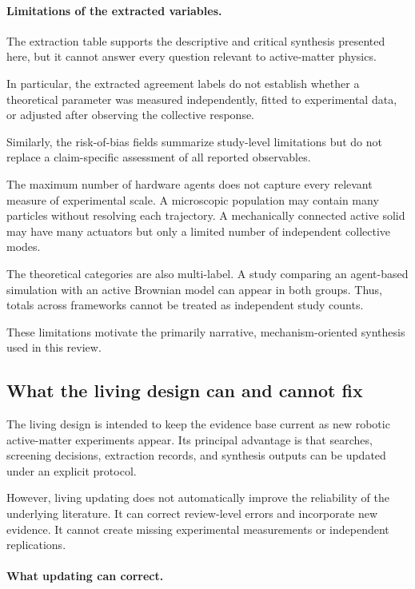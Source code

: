 \paragraph*{Limitations of the extracted variables.}

The extraction table supports
the descriptive and
critical synthesis
presented here,
but it cannot
answer every
question relevant
to active-matter
physics.

In particular,
the extracted
agreement labels
do not establish
whether a
theoretical parameter
was measured
independently,
fitted to
experimental data,
or adjusted
after observing
the collective
response.

Similarly,
the risk-of-bias
fields summarize
study-level
limitations but
do not replace
a claim-specific
assessment of
all reported
observables.

The maximum
number of
hardware agents
does not capture
every relevant
measure of
experimental scale.
A microscopic
population may
contain many
particles without
resolving each
trajectory.
A mechanically
connected active
solid may have
many actuators
but only a
limited number
of independent
collective modes.

The theoretical
categories are
also multi-label.
A study comparing
an agent-based
simulation with
an active Brownian
model can appear
in both groups.
Thus, totals
across frameworks
cannot be treated
as independent
study counts.

These limitations
motivate the
primarily narrative,
mechanism-oriented
synthesis used
in this review.

\subsection{What the living design can and cannot fix}
\label{sec:discussion-living}

The living design is intended to keep the evidence
base current as new robotic active-matter
experiments appear. Its principal advantage
is that searches, screening decisions,
extraction records, and synthesis outputs
can be updated under an explicit protocol.

However, living updating does not
automatically improve the reliability
of the underlying literature.
It can correct review-level
errors and incorporate new
evidence. It cannot create
missing experimental
measurements or
independent replications.

\paragraph*{What updating can correct.}

